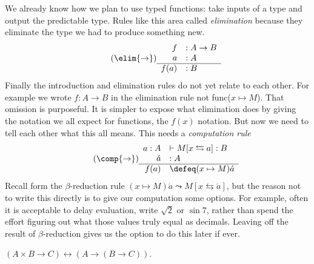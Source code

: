 We already know how we plan to use typed functions:
take inputs of a type and output the predictable type.
Rules like this area called \emph{elimination} because 
they eliminate the type we had to produce something new.
\begin{gather}
    \tag{$\elim{\to}$}
    \begin{array}{rl}
        f&:A\to B\\
        a&:A\\
    \hline
        f(a)&:B
    \end{array}
\end{gather}
Finally the introduction and elimination rules do not yet 
relate to each other.  For example we wrote $f:A\to B$ in the 
elimination rule not func($x\mapsto M$).  That omission is 
purposeful.  It is simpler to expose what elimination does 
by giving the notation we all expect for functions, the $f(x)$
notation.  But now we need to tell each other what this all 
means.  This needs a \emph{computation rule}
\begin{gather}
    \tag{$\comp{\to}$}
    \begin{array}{rl}
        a:A&\vdash M[x\leftrightarrows a]:B\\
        \acute{a}&:A\\
    \hline
        f(a)&\defeq (x\mapsto M)\acute{a}
    \end{array}
\end{gather}
Recall form the $\beta$-reduction rule 
$(x\mapsto M)\acute{a}\leadsto M[x\leftrightarrows \acute{a}]$,
but the reason not to write this directly is to give 
our computation some options.  For example, 
often it is acceptable to delay evaluation, write $\sqrt{2}$
or $\sin 7$, rather than spend the effort figuring out what 
those values truly equal as decimals.  Leaving off the 
result of $\beta$-reduction gives us the option to do this 
later if ever.


\begin{theorem}
    $(A\times B\to C)\longleftrightarrow (A\to (B\to C))$.
\end{theorem}








